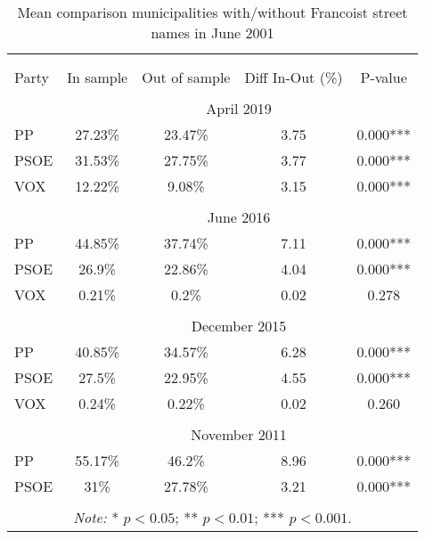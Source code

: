 \begin{table}[!htbp] \centering
\caption{Mean comparison municipalities with/without Francoist street names in June 2001}
\label{tab:ttest_sample2001}
\small
\begin{tabular}{lcccc}
\\[-1.8ex]\hline
\hline \\[-1.8ex]
\\[-1.8ex]
Party & In sample & Out of sample & Diff In-Out (\%) & P-value \\
\hline \\[-1.8ex]
& \multicolumn{4}{c}{April 2019}\\
PP & 27.23\% & 23.47\% & 3.75 & 0.000*** \\
PSOE & 31.53\% & 27.75\% & 3.77 & 0.000*** \\
VOX & 12.22\% & 9.08\% & 3.15 & 0.000*** \\
\hline \\[-1.8ex]
& \multicolumn{4}{c}{June 2016}\\
PP & 44.85\% & 37.74\% & 7.11 & 0.000*** \\
PSOE & 26.9\% & 22.86\% & 4.04 & 0.000*** \\
VOX & 0.21\% & 0.2\% & 0.02 & 0.278 \\
\hline \\[-1.8ex]
& \multicolumn{4}{c}{December 2015}\\
PP & 40.85\% & 34.57\% & 6.28 & 0.000*** \\
PSOE & 27.5\% & 22.95\% & 4.55 & 0.000*** \\
VOX & 0.24\% & 0.22\% & 0.02 & 0.260 \\
\hline \\[-1.8ex]
& \multicolumn{4}{c}{November 2011}\\
PP & 55.17\% & 46.2\% & 8.96 & 0.000*** \\
PSOE & 31\% & 27.78\% & 3.21 & 0.000*** \\
\hline
\hline \\[-1.8ex]
\multicolumn{5}{c}{\parbox[t]{0.65\textwidth}{\textit{Note:} * $p<0.05$; ** $p<0.01$; *** $p<0.001$.}}\\
\end{tabular}
\end{table}
